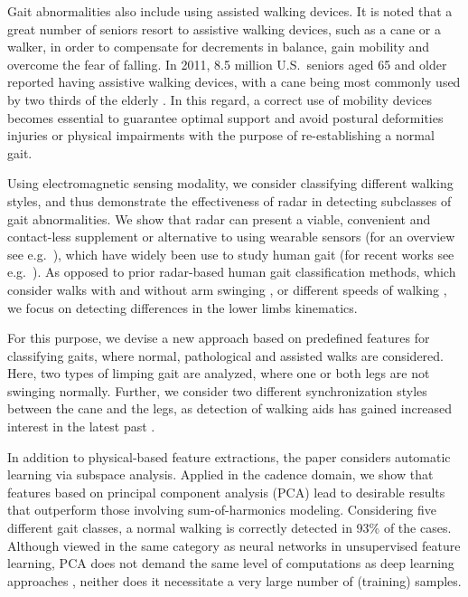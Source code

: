 Gait abnormalities also include using assisted walking devices. It is noted that a great number of seniors resort to assistive walking devices, such as a cane or a walker, in order to compensate for decrements in balance, gain mobility and overcome the fear of falling. In 2011, 8.5 million U.S.~seniors aged 65 and older reported having assistive walking devices, with a cane being most commonly used by two thirds of the elderly \cite{Gel15}. In this regard, a correct use of mobility devices becomes essential to guarantee optimal support and avoid postural deformities injuries or physical impairments with the purpose of re-establishing a normal gait. 

Using electromagnetic sensing modality, we consider classifying different walking styles, and thus demonstrate the effectiveness of radar in detecting subclasses of gait abnormalities. We show that radar can present a viable, convenient and contact-less supplement or alternative to using wearable sensors (for an overview see e.g.~\cite{Tao12}), which have widely been use to study human gait (for recent works see e.g.~\cite{Pha17,Ren17,Bro15}). As opposed to prior radar-based human gait classification methods, which consider walks with and without arm swinging \cite{Mob09,Tiv10,Tiv15}, or different speeds of walking \cite{Cle15,Ric15}, we focus on detecting differences in the lower limbs kinematics.

For this purpose, we devise a new approach based on predefined features for classifying gaits, where normal, pathological and assisted walks are considered. Here, two types of limping gait are analyzed, where one or both legs are not swinging normally. Further, we consider two different synchronization styles between the cane and the legs, as detection of walking aids has gained increased interest in the latest past \cite{Gur17,Sey18}. 

In addition to physical-based feature extractions, the paper considers automatic learning via subspace analysis. Applied in the cadence domain, we show that features based on principal component analysis (PCA) lead to desirable results that outperform those involving sum-of-harmonics modeling. Considering five different gait classes, a normal walking is correctly detected in 93\% of the cases. Although viewed in the same category as neural networks in unsupervised feature learning, PCA does not demand the same level of computations as deep learning approaches \cite{Jok16,Kim16,Sey18}, neither does it necessitate a very large number of (training) samples.  

